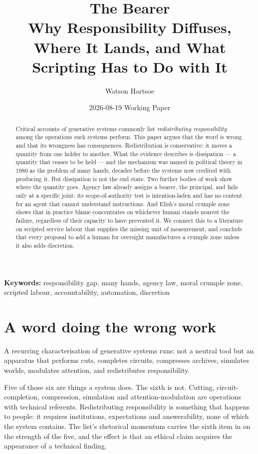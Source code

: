\documentclass[11pt,a4paper]{article}
\title{\textbf{The Bearer}\\[.35em]\large Why Responsibility Diffuses, Where It Lands, and What Scripting Has to Do with It}
\author{Watson Hartsoe}
\date{2026-08-19 \quad\textemdash\quad Working Paper}
\begin{document}
\maketitle
\begin{abstract}\noindent Critical accounts of generative systems commonly list \emph{redistributing responsibility} among the operations such systems perform. This paper argues that the word is wrong and that its wrongness has consequences. Redistribution is conservative: it moves a quantity from one holder to another. What the evidence describes is dissipation --- a quantity that ceases to be held --- and the mechanism was named in political theory in 1980 as the problem of many hands, decades before the systems now credited with producing it. But dissipation is not the end state. Two further bodies of work show where the quantity goes. Agency law already assigns a bearer, the principal, and fails only at a specific joint: its scope-of-authority test is intention-laden and has no content for an agent that cannot understand instructions. And Elish's moral crumple zone shows that in practice blame concentrates on whichever human stands nearest the failure, regardless of their capacity to have prevented it. We connect this to a literature on scripted service labour that supplies the missing unit of measurement, and conclude that every proposal to add a human for oversight manufactures a crumple zone unless it also adds discretion.\end{abstract}
\vspace{-.5em}\noindent\textbf{Keywords:} responsibility gap, many hands, agency law, moral crumple zone, scripted labour, accountability, automation, discretion\par\vspace{1em}
\section{A word doing the wrong work}
A recurring characterisation of generative systems runs: not a neutral tool but an apparatus that performs cuts, completes circuits, compresses archives, simulates worlds, modulates attention, and redistributes responsibility.

Five of those six are things a system does. The sixth is not. Cutting, circuit-completion, compression, simulation and attention-modulation are operations with technical referents. Redistributing responsibility is something that happens to people: it requires institutions, expectations and answerability, none of which the system contains. The list's rhetorical momentum carries the sixth item in on the strength of the five, and the effect is that an ethical claim acquires the appearance of a technical finding.
\end{document}

